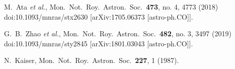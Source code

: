 \documentclass[prd,twocolumn,showpacs,preprintnumbers,amsmath,amssymb,superscriptaddress,nofootinbib,english]{revtex4-1}
\begin{document}
\begin{thebibliography}{99}
  M.~Ata {\it et al.},
  Mon.\ Not.\ Roy.\ Astron.\ Soc.\  {\bf 473}, no. 4, 4773 (2018)
  doi:10.1093/mnras/stx2630
  [arXiv:1705.06373 [astro-ph.CO]].

  G.~B.~Zhao {\it et al.},
  Mon.\ Not.\ Roy.\ Astron.\ Soc.\  {\bf 482}, no. 3, 3497 (2019)
  doi:10.1093/mnras/sty2845
  [arXiv:1801.03043 [astro-ph.CO]].

  N.~Kaiser,
  Mon.\ Not.\ Roy.\ Astron.\ Soc.\  {\bf 227}, 1 (1987).


\end{thebibliography}
\end{document}
